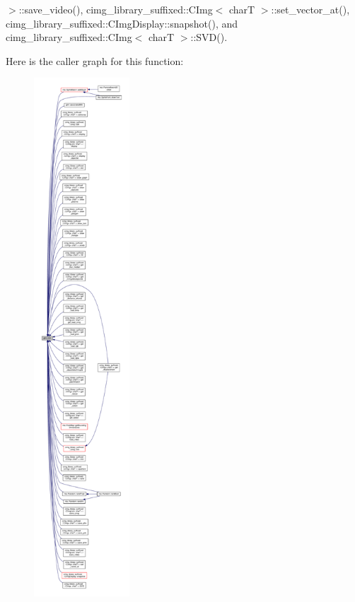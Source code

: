 $>$\+::save\+\_\+video(), cimg\+\_\+library\+\_\+suffixed\+::\+C\+Img$<$ char\+T $>$\+::set\+\_\+vector\+\_\+at(), cimg\+\_\+library\+\_\+suffixed\+::\+C\+Img\+Display\+::snapshot(), and cimg\+\_\+library\+\_\+suffixed\+::\+C\+Img$<$ char\+T $>$\+::\+S\+V\+D().

Here is the caller graph for this function\+:
\nopagebreak
\begin{figure}[H]
\begin{center}
\leavevmode
\includegraphics[height=550pt]{d0/de3/group__core__func__common_ga2c2bde1cec025b7ddff83c74a1113719_icgraph}
\end{center}
\end{figure}
\mbox{\label{group__core__func__common_ga2d274e8b537c173dba983331a2620736}} 
